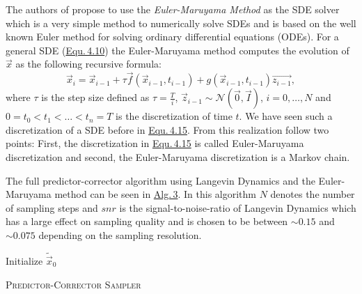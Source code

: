 The authors of \cite{score_3} propose to use the \textit{Euler-Maruyama Method} as the SDE solver which is a very simple method to numerically solve SDEs and is based on the well known Euler method for solving ordinary differential equations (ODEs). For a general SDE (\hyperref[equ:4.10]{Equ.\,4.10}) the Euler-Maruyama method computes the evolution of $\vec{x}$ as the following recursive formula:
%
\begin{equation} \label{equ:4.20}
    \vec{x}_i=\vec{x}_{i-1}+\tau\vec{f}(\vec{x}_{i-1}, t_{i-1})+g(\vec{x}_{i-1}, t_{i-1})\vec{z_{i-1}},
\end{equation}
%
where $\tau$ is the step size defined as $\tau=\frac{T}{i}$, $\vec{z}_{i-1}\sim\mathcal{N}(\vec{0},\vec{I})$, $i=0,\dots,N$ and $0=t_0<t_1<\dots<t_n=T$ is the discretization of time $t$. We have seen such a discretization of a SDE before in \hyperref[equ:4.15]{Equ.\,4.15}. From this realization follow two points: First, the discretization in \hyperref[equ:4.15]{Equ.\,4.15} is called Euler-Maruyama discretization and second, the Euler-Maruyama discretization is a Markov chain.

The full predictor-corrector algorithm using Langevin Dynamics and the Euler-Maruyama method can be seen in \hyperref[alg:3]{Alg.\,3}. In this algorithm $N$ denotes the number of sampling steps and $snr$ is the signal-to-noise-ratio of Langevin Dynamics which has a large effect on sampling quality and is chosen to be between $\sim0.15$ and $\sim0.075$ depending on the sampling resolution. 
%
\begin{algorithm} \label{alg:3}
    \DontPrintSemicolon
    Initialize $\tilde{\vec{x}}_0$\;

    
    \caption{\textsc{Predictor-Corrector Sampler}}
\end{algorithm}
%

